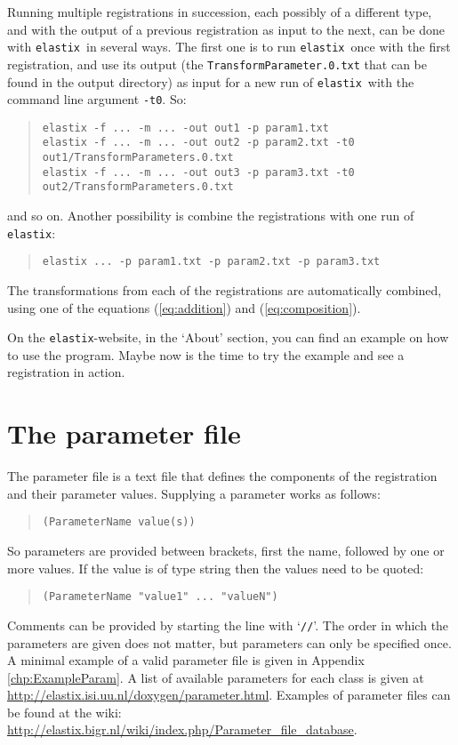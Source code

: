 \documentclass[]{report}
\newcommand{\elastix}{\texttt{elastix}}
\begin{document}
Running multiple registrations in succession, each possibly of a
different type, and with the output of a previous registration as
input to the next, can be done with \elastix\ in several ways. The
first one is to run \elastix\ once with the first registration, and
use its output (the \texttt{TransformParameter.0.txt} that can be
found in the output directory) as input for a new run of \elastix\
with the command line argument \texttt{-t0}. So:
\begin{quote}
\texttt{elastix -f ... -m ... -out out1 -p param1.txt} \\
\texttt{elastix -f ... -m ... -out out2 -p param2.txt -t0
out1/TransformParameters.0.txt} \\
\texttt{elastix -f ... -m ... -out out3 -p param3.txt -t0
out2/TransformParameters.0.txt}
\end{quote}
and so on. Another possibility is combine the registrations with one
run of \elastix:
\begin{quote}
\texttt{elastix ... -p param1.txt -p param2.txt -p param3.txt}
\end{quote}
The transformations from each of the registrations are automatically
combined, using one of the equations (\ref{eq:addition}) and
(\ref{eq:composition}).

On the \elastix-website, in the `About' section, you can find an
example on how to use the program. Maybe now is the time to try
the example and see a registration in action.


\section{The parameter file}\label{sec:elastix:param}

The parameter file is a text file that defines the components of the
registration and their parameter values. Supplying a parameter works
as follows:
\begin{quote}
\texttt{(ParameterName value(s))}
\end{quote}
So parameters are provided between brackets, first the name,
followed by one or more values. If the value is of type string then
the values need to be quoted:
\begin{quote}
\texttt{(ParameterName "value1" ... "valueN")}
\end{quote}
Comments can be provided by starting the line with `\texttt{//}'.
The order in which the parameters are given does not matter, but
parameters can only be specified once. A minimal example of a valid
parameter file is given in Appendix \ref{chp:ExampleParam}. A list
of available parameters for each class is given at
\url{http://elastix.isi.uu.nl/doxygen/parameter.html}. Examples of
parameter files can be found at the wiki:
\url{http://elastix.bigr.nl/wiki/index.php/Parameter_file_database}.
\end{document}
